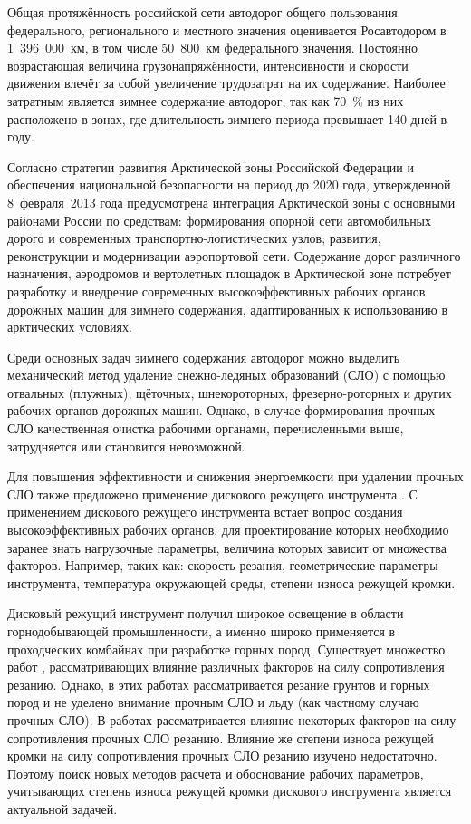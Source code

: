 {\actuality} Общая протяжённость российской сети автодорог общего пользования федерального, регионального и местного значения оценивается Росавтодором в 1~396~000~км, в том числе 50~800~км федерального значения. Постоянно возрастающая величина грузонапряжённости, интенсивности и скорости движения влечёт за собой увеличение трудозатрат на их содержание. Наиболее затратным является зимнее содержание автодорог, так как 70~\% из них расположено в зонах, где длительность зимнего периода превышает 140 дней в году.

Согласно стратегии \cite{Strategi} развития Арктической зоны Российской Федерации и обеспечения национальной безопасности на период до 2020 года, утвержденной 8~февраля~2013 года предусмотрена интеграция Арктической зоны с основными районами России по средствам: формирования опорной сети автомобильных дорого и современных транспортно-логистических узлов; развития, реконструкции и модернизации аэропортовой сети. Содержание дорог различного назначения, аэродромов и вертолетных площадок в Арктической зоне потребует разработку и внедрение современных высокоэффективных рабочих органов дорожных машин для зимнего содержания, адаптированных к использованию в арктических условиях.

Среди основных задач зимнего содержания автодорог можно выделить механический метод удаление снежно-ледяных образований (СЛО) с помощью отвальных (плужных), щёточных, шнекороторных, фрезерно-роторных и других рабочих органов дорожных машин. Однако, в случае формирования прочных СЛО качественная очистка рабочими органами, перечисленными выше, затрудняется или становится невозможной.

Для повышения эффективности и снижения энергоемкости при удалении прочных СЛО также предложено применение дискового режущего инструмента . С применением дискового режущего инструмента встает вопрос создания высокоэффективных рабочих органов, для проектирование которых необходимо заранее знать нагрузочные параметры, величина которых зависит от множества факторов. Например, таких как: скорость резания, геометрические параметры инструмента, температура окружающей среды, степени износа режущей кромки.

Дисковый режущий инструмент получил широкое освещение в области горнодобывающей промышленности, а именно широко применяется в проходческих комбайнах при разработке горных пород. Существует множество работ \todo{[литература]}, рассматривающих влияние различных факторов на силу сопротивления резанию. Однако, в этих работах рассматривается резание грунтов и горных пород и не уделено внимание прочным СЛО и льду (как частному случаю прочных СЛО). В работах  рассматривается влияние некоторых факторов на силу сопротивления прочных СЛО резанию. Влияние же степени износа режущей кромки на силу сопротивления прочных СЛО резанию изучено недостаточно. Поэтому поиск новых методов расчета и обоснование рабочих параметров, учитывающих степень износа режущей кромки дискового инструмента является актуальной задачей.


